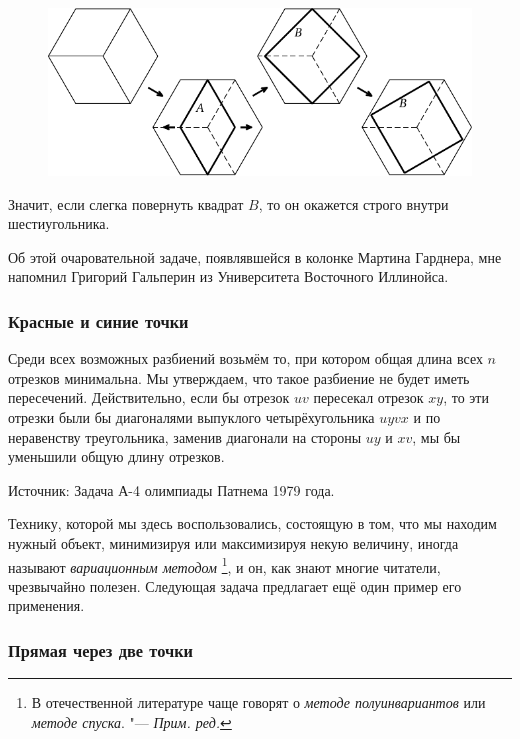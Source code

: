 \documentclass[twoside]{book}
\begin{document}
\begin{figure}[!ht]
\centering
\includegraphics{mp/wink-11}
\end{figure}

Значит, если слегка повернуть квадрат $B$, то он окажется строго внутри шестиугольника.\heart

\medskip

Об этой очаровательной задаче, появлявшейся в колонке Мартина Гарднера, мне напомнил Григорий Гальперин из Университета Восточного Иллинойса.

\subsubsection*{Красные и синие точки}%

Среди всех возможных разбиений возьмём то, при котором общая длина всех $n$ отрезков минимальна.
Мы утверждаем, что такое разбиение не будет иметь пересечений.
Действительно, если бы отрезок $uv$ пересекал отрезок $xy$, то эти отрезки были бы диагоналями выпуклого четырёхугольника $uyvx$ %
и по неравенству треугольника, заменив диагонали на стороны $uy$ и $xv$, мы бы уменьшили общую длину отрезков.
\heart


\medskip
{%
Источник: Задача А-4 олимпиады Патнема 1979 года.

}

Технику, которой мы здесь воспользовались, состоящую в том, что мы находим нужный объект, минимизируя или максимизируя некую величину, иногда называют \emph{вариационным методом}%
\footnote{В отечественной литературе чаще говорят о \emph{методе полуинвариантов} или \emph{методе спуска}. "--- \emph{Прим. ред.}},
и он, как знают многие читатели, чрезвычайно полезен.
Следующая задача предлагает ещё один пример его применения.


\subsubsection*{Прямая через две точки}%
\end{document}

